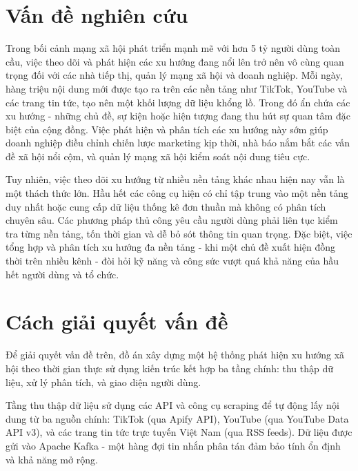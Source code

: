 
\section*{Vấn đề nghiên cứu}

Trong bối cảnh mạng xã hội phát triển mạnh mẽ với hơn 5 tỷ người dùng toàn cầu, việc theo dõi và phát hiện các xu hướng đang nổi lên trở nên vô cùng quan trọng đối với các nhà tiếp thị, quản lý mạng xã hội và doanh nghiệp. Mỗi ngày, hàng triệu nội dung mới được tạo ra trên các nền tảng như TikTok, YouTube và các trang tin tức, tạo nên một khối lượng dữ liệu khổng lồ. Trong đó ẩn chứa các xu hướng - những chủ đề, sự kiện hoặc hiện tượng đang thu hút sự quan tâm đặc biệt của cộng đồng. Việc phát hiện và phân tích các xu hướng này sớm giúp doanh nghiệp điều chỉnh chiến lược marketing kịp thời, nhà báo nắm bắt các vấn đề xã hội nổi cộm, và quản lý mạng xã hội kiểm soát nội dung tiêu cực.

Tuy nhiên, việc theo dõi xu hướng từ nhiều nền tảng khác nhau hiện nay vẫn là một thách thức lớn. Hầu hết các công cụ hiện có chỉ tập trung vào một nền tảng duy nhất hoặc cung cấp dữ liệu thống kê đơn thuần mà không có phân tích chuyên sâu. Các phương pháp thủ công yêu cầu người dùng phải liên tục kiểm tra từng nền tảng, tốn thời gian và dễ bỏ sót thông tin quan trọng. Đặc biệt, việc tổng hợp và phân tích xu hướng đa nền tảng - khi một chủ đề xuất hiện đồng thời trên nhiều kênh - đòi hỏi kỹ năng và công sức vượt quá khả năng của hầu hết người dùng và tổ chức.

\section*{Cách giải quyết vấn đề}

Để giải quyết vấn đề trên, đồ án xây dựng một hệ thống phát hiện xu hướng xã hội theo thời gian thực sử dụng kiến trúc kết hợp ba tầng chính: thu thập dữ liệu, xử lý phân tích, và giao diện người dùng.

Tầng thu thập dữ liệu sử dụng các API và công cụ scraping để tự động lấy nội dung từ ba nguồn chính: TikTok (qua Apify API), YouTube (qua YouTube Data API v3), và các trang tin tức trực tuyến Việt Nam (qua RSS feeds). Dữ liệu được gửi vào Apache Kafka - một hàng đợi tin nhắn phân tán đảm bảo tính ổn định và khả năng mở rộng.

